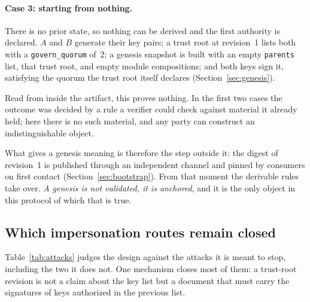 \documentclass[11pt,a4paper]{article}
\begin{document}
\paragraph{Case 3: starting from nothing.}
There is no prior state, so nothing can be derived and the first authority is
declared. $A$ and $B$ generate their key pairs; a trust root at revision~1 lists
both with a \texttt{govern\_quorum} of~2; a genesis snapshot is built with an
empty \texttt{parents} list, that trust root, and empty module compositions; and
both keys sign it, satisfying the quorum the trust root itself declares
(Section~\ref{sec:genesis}).

Read from inside the artifact, this proves nothing. In the first two cases the
outcome was decided by a rule a verifier could check against material it
already held; here there is no such material, and any party can construct an
indistinguishable object.

What gives a genesis meaning is therefore the step outside it: the digest of
revision~1 is published through an independent channel and pinned by consumers
on first contact (Section~\ref{sec:bootstrap}). From that moment the derivable
rules take over. \emph{A genesis is not validated, it is anchored}, and it is
the only object in this protocol of which that is true.

\subsection{Which impersonation routes remain closed}
\label{sec:impersonation}

Table~\ref{tab:attacks} judges the design against the attacks it is meant to
stop, including the two it does not. One mechanism closes most of them: a
trust-root revision is not a claim about the key list but a document that must
carry the signatures of keys authorized in the previous list.
\end{document}
